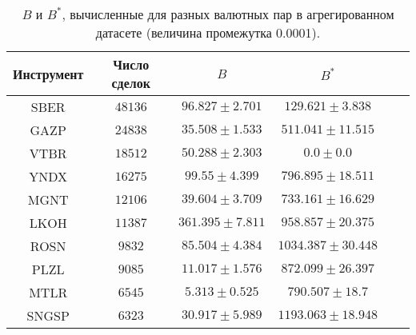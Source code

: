
\begin{table}[h!]
    \begin{center}
        \begin{tabular}{|c|c|c|c|c|c|}
            \hline
            Инструмент & Число сделок & $B$                 & $B ^*$                \\ \hline
            SBER & $48136$ & $96.827 \pm 2.701$ & $129.621 \pm 3.838$ \\ \hline
            GAZP       & $24838$      & $35.508 \pm 1.533$  & $511.041 \pm 11.515$  \\ \hline
            VTBR       & $18512$      & $50.288 \pm 2.303$  & $0.0 \pm 0.0$         \\ \hline
            YNDX       & $16275$      & $99.55 \pm 4.399$   & $796.895 \pm 18.511$  \\ \hline
            MGNT       & $12106$      & $39.604 \pm 3.709$  & $733.161 \pm 16.629$  \\ \hline
            LKOH       & $11387$      & $361.395 \pm 7.811$ & $958.857 \pm 20.375$  \\ \hline
            ROSN       & $9832$       & $85.504 \pm 4.384$  & $1034.387 \pm 30.448$ \\ \hline
            PLZL       & $9085$       & $11.017 \pm 1.576$  & $872.099 \pm 26.397$  \\ \hline
            MTLR       & $6545$       & $5.313 \pm 0.525$   & $790.507 \pm 18.7$    \\ \hline
            SNGSP      & $6323$       & $30.917 \pm 5.989$  & $1193.063 \pm 18.948$ \\ \hline
        \end{tabular}
    \end{center}\caption{$B$ и $B ^*$, вычисленные для разных валютных пар в агрегированном датасете (величина промежутка 0.0001).}
    \label{Aggreg1CU0.0001} \end{table}

